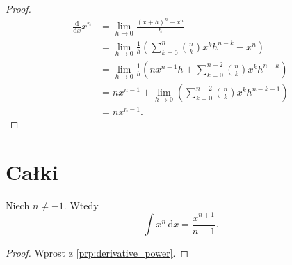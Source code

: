 \documentclass{createspace}
\begin{document}
\begin{proof}
\begin{align}
    \frac{\mathrm{d}}{\mathrm{d}x} x^n
    & = \lim_{h \to 0} \frac{(x+h)^n - x^n}{h} \\
    & = \lim_{h \to 0} \frac{1}{h} \left(\sum_{k=0}^n {n \choose k} x^k h^{n-k} - x^n \right) \\
    & = \lim_{h \to 0} \frac{1}{h} \left(nx^{n-1}h + \sum_{k=0}^{n-2} {n \choose k} x^k h^{n-k}\right) \\
    & = nx^{n-1} + \lim_{h \to 0} \left(\sum_{k=0}^{n-2} {n \choose k} x^k h^{n-k-1}\right) \\
    & = nx^{n-1}.
\end{align}
\end{proof}

\chapter{Całki}

\begin{integral}
    Niech $n \neq -1$.
    Wtedy
\begin{equation}
    \int x^n \,\mathrm{d}x = \frac{x^{n+1}}{n+1}.
\end{equation}
\end{integral}

\begin{proof}
    Wprost z \ref{prp:derivative_power}.
\end{proof}
\end{document}
